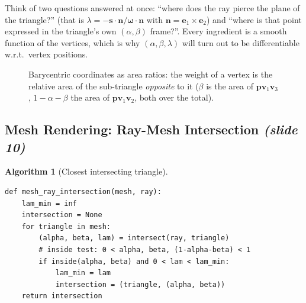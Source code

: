 \documentclass[11pt,a4paper]{article}
\newcommand{\sr}[1]{\texorpdfstring{\emph{(#1)}}{(#1)}}
\theoremstyle{definition}
\newtheorem{algorithm}{Algorithm}[section]
\theoremstyle{plain}
\theoremstyle{remark}
\begin{document}
\begin{intuition}
Think of two questions answered at once: ``where does the ray pierce the plane of the triangle?'' (that is $\lambda=-\bm s\cdot\bm n/\bm\omega\cdot\bm n$ with $\bm n=\bm e_1\times\bm e_2$) and ``where is that point expressed in the triangle's own $(\alpha,\beta)$ frame?''. Every ingredient is a smooth function of the vertices, which is why $(\alpha,\beta,\lambda)$ will turn out to be differentiable w.r.t.\ vertex positions.
\end{intuition}

\begin{figure}[htbp]
\centering
{}
\caption{Barycentric coordinates as area ratios: the weight of a vertex is the relative area of the sub-triangle \emph{opposite} to it ($\beta$ is the area of $\bm p\bm v_1\bm v_3$, $1-\alpha-\beta$ the area of $\bm p\bm v_1\bm v_2$, both over the total).}
\end{figure}

\subsection{Mesh Rendering: Ray-Mesh Intersection \sr{slide 10}}
\begin{algorithm}[Closest intersecting triangle]
\begin{lstlisting}
def mesh_ray_intersection(mesh, ray):
    lam_min = inf
    intersection = None
    for triangle in mesh:
        (alpha, beta, lam) = intersect(ray, triangle)
        # inside test: 0 < alpha, beta, (1-alpha-beta) < 1
        if inside(alpha, beta) and 0 < lam < lam_min:
            lam_min = lam
            intersection = (triangle, (alpha, beta))
    return intersection
\end{lstlisting}
\end{algorithm}
\end{document}
